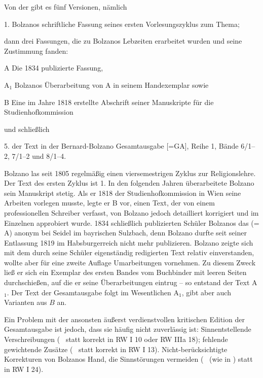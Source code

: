 Von der  gibt es fünf Versionen, nämlich 
\begin{compactenum}[1.]
\item[1.] Bolzanos schriftliche Fassung seines ersten Vorlesungszyklus zum Thema;
\end{compactenum}
dann drei Fassungen, die zu Bolzanos Lebzeiten erarbeitet wurden und seine Zustimmung fanden:
\begin{compactenum}[1.]
\item[A] Die 1834 publizierte Fassung,
\item[A$_1$] Bolzanos Überarbeitung von A in seinem Handexemplar sowie
\item[B] Eine im Jahre 1818 erstellte Abschrift seiner Manuskripte für die Studienhofkommission
\end{compactenum}
und schließlich
\begin{compactenum}[1.]
\item[5.] der Text in der Bernard-Bolzano Gesamtausgabe [=GA], Reihe 1, Bände 6/1--2, 7/1--2 und 8/1--4.
\end{compactenum}
Bolzano las seit 1805 regelmäßig einen viersemestrigen Zyklus zur Religionslehre. Der Text des ersten Zyklus ist 1. In den folgenden Jahren überarbeitete Bolzano sein Manuskript stetig. Als er 1818 der Studienhofkommission in Wien seine Arbeiten vorlegen musste, legte er B vor, einen Text, der von einem professionellen Schreiber verfasst, von Bolzano jedoch detailliert korrigiert und im Einzelnen approbiert wurde. 1834 schließlich publizierten Schüler Bolzanos das   (= A) anonym bei Seidel im bayrischen Sulzbach, denn  Bolzano durfte seit seiner Entlassung 1819 im Habsburgerreich nicht mehr publizieren. Bolzano zeigte sich mit dem durch seine Schüler eigenständig redigierten Text relativ einverstanden, wollte aber für eine zweite Auflage Umarbeitungen vornehmen. Zu diesem Zweck ließ er sich ein Exemplar des ersten Bandes vom Buchbinder mit leeren Seiten durchschießen, auf die er seine Überarbeitungen eintrug -- so entstand der Text A$_1$. Der Text der Gesamtausgabe folgt im Wesentlichen A$_1$, gibt aber auch Varianten aus $B$ an.\par
Ein Problem mit der ansonsten äußerst verdienstvollen kritischen Edition der Gesamtausgabe ist jedoch, dass sie häufig nicht zuverlässig ist:
Sinnentstellende Verschreibungen (\zB\  statt korrekt  in RW I 10 oder RW IIIa 18); fehlende gewichtende Zusätze (\zB\  statt korrekt  in RW I 13). Nicht-berücksichtigte Korrekturen von Bolzanos Hand, die Sinnstörungen vermeiden (\zB\  (wie in \Alabel ) statt  in RW I 24).
